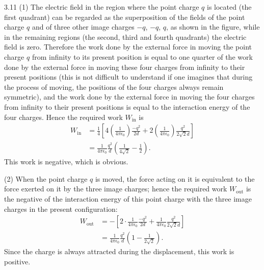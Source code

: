 \begin{solution}{3.11}
(1) The electric field in the region where the point charge $q$ is located (the first quadrant) can be regarded as the superposition of the fields of the point charge $q$ and of three other image charges $-q$, $-q$, $q$, as shown in the figure, while in the remaining regions (the second, third and fourth quadrants) the electric field is zero. Therefore the work done by the external force in moving the point charge $q$ from infinity to its present position is equal to one quarter of the work done by the external force in moving these four charges from infinity to their present positions (this is not difficult to understand if one imagines that during the process of moving, the positions of the four charges always remain symmetric), and the work done by the external force in moving the four charges from infinity to their present positions is equal to the interaction energy of the four charges. Hence the required work $W_{\mathrm{in}}$ is
\begin{align*}
W_{\mathrm{in}}&=\frac{1}{4}\left[4\left(\frac{1}{4\pi\epsilon_0}\right)\frac{-q^2}{2d}
+2\left(\frac{1}{4\pi\epsilon_0}\right)\frac{q^2}{2\sqrt{2}d}\right]\\
&=\frac{1}{4\pi\epsilon_0}\frac{q^2}{d}\left(\frac{1}{4\sqrt{2}}-\frac{1}{2}\right).
\end{align*}
This work is negative, which is obvious.

(2) When the point charge $q$ is moved, the force acting on it is equivalent to the force exerted on it by the three image charges; hence the required work $W_{\mathrm{out}}$ is the negative of the interaction energy of this point charge with the three image charges in the present configuration:
\begin{align*}
W_{\mathrm{out}}&=-\left[2\cdot\frac{1}{4\pi\epsilon_0}\frac{-q^2}{2d}
+\frac{1}{4\pi\epsilon_0}\frac{q^2}{2\sqrt{2}d}\right]\\
&=\frac{1}{4\pi\epsilon_0}\frac{q^2}{d}\left(1-\frac{1}{2\sqrt{2}}\right).
\end{align*}
Since the charge is always attracted during the displacement, this work is positive.


\end{solution}
